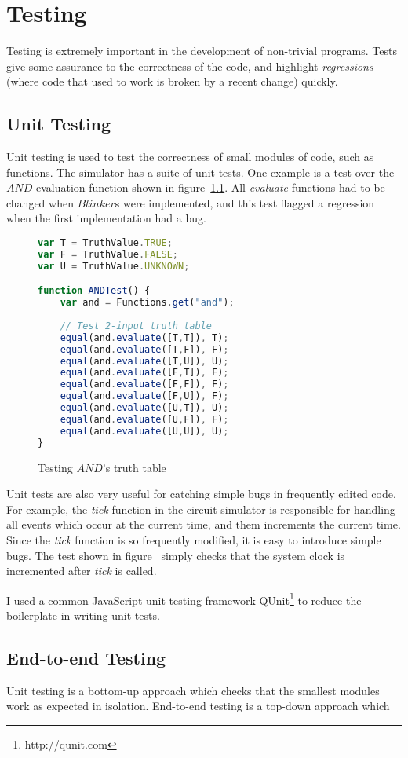 \chapter{Testing}
Testing is extremely important in the development of non-trivial programs. Tests give some assurance to the correctness of the code, and highlight \textit{regressions} (where code that used to work is broken by a recent change) quickly.

\section{Unit Testing}
Unit testing is used to test the correctness of small modules of code, such as functions. The simulator has a suite of unit tests. One example is a test over the $AND$ evaluation function shown in figure~\ref{fig:andtest}. All \textit{evaluate} functions had to be changed when $Blinker$s were implemented, and this test flagged a regression when the first implementation had a bug.

\begin{figure}
\begin{lstlisting}[language=JavaScript]
var T = TruthValue.TRUE;
var F = TruthValue.FALSE;
var U = TruthValue.UNKNOWN;

function ANDTest() {
	var and = Functions.get("and");	
	
	// Test 2-input truth table
	equal(and.evaluate([T,T]), T);
	equal(and.evaluate([T,F]), F);
	equal(and.evaluate([T,U]), U);
	equal(and.evaluate([F,T]), F);
	equal(and.evaluate([F,F]), F);
	equal(and.evaluate([F,U]), F);
	equal(and.evaluate([U,T]), U);
	equal(and.evaluate([U,F]), F);
	equal(and.evaluate([U,U]), U);
}
\end{lstlisting}
\caption{Testing $AND$'s truth table}
\label{fig:andtest}
\end{figure}

Unit tests are also very useful for catching simple bugs in frequently edited code. For example, the \textit{tick} function in the circuit simulator is responsible for handling all events which occur at the current time, and them increments the current time. Since the \textit{tick} function is so frequently modified, it is easy to introduce simple bugs. The test shown in figure~ simply checks that the system clock is incremented after \textit{tick} is called.

I used a common JavaScript unit testing framework QUnit\footnote{http://qunit.com} to reduce the boilerplate in writing unit tests.

\section{End-to-end Testing}
Unit testing is a bottom-up approach which checks that the smallest modules work as expected in isolation. End-to-end testing is a top-down approach which